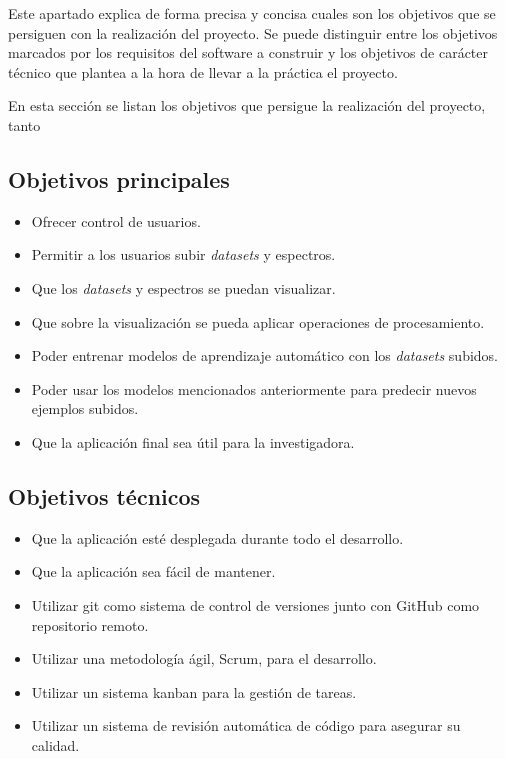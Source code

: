 
Este apartado explica de forma precisa y concisa cuales son los objetivos que se
persiguen con la realización del proyecto. Se puede distinguir entre los
objetivos marcados por los requisitos del software a construir y los objetivos
de carácter técnico que plantea a la hora de llevar a la práctica el proyecto.

En esta sección se listan los objetivos que persigue la realización del
proyecto, tanto 

\subsection{Objetivos principales}
\begin{itemize}
	\tightlist
	\item Ofrecer control de usuarios.
	\item Permitir a los usuarios subir \textit{datasets} y espectros.
	\item Que los \textit{datasets} y espectros se puedan visualizar.
	\item Que sobre la visualización se pueda aplicar operaciones de procesamiento.
	\item Poder entrenar modelos de aprendizaje automático con los
	\textit{datasets} subidos.
	\item Poder usar los modelos mencionados anteriormente para predecir nuevos
	ejemplos subidos.
	\item Que la aplicación final sea útil para la investigadora.
\end{itemize}

\subsection{Objetivos técnicos}
\begin{itemize}
	\tightlist
	\item Que la aplicación esté desplegada durante todo el desarrollo.
	\item Que la aplicación sea fácil de mantener.
	\item Utilizar git como sistema de control de versiones junto con GitHub como
	repositorio remoto.
	\item Utilizar una metodología ágil, Scrum, para el desarrollo.
	\item Utilizar un sistema kanban para la gestión de tareas.
	\item Utilizar un sistema de revisión automática de código para asegurar su
	calidad.
\end{itemize}

